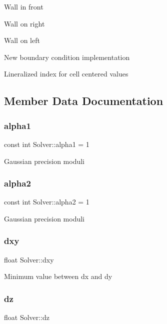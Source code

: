 Wall in front

Wall on right

Wall on left

New boundary condition implementation

Lineralized index for cell centered values 

\subsection{Member Data Documentation}
\mbox{\label{classSolver_a1dba41a0d2c04b18cf121e2730a5d2f0}} 
\subsubsection{\texorpdfstring{alpha1}{alpha1}}
{\footnotesize\ttfamily const int Solver\+::alpha1 = 1\hspace{0.3cm}{\ttfamily [protected]}}

Gaussian precision moduli \mbox{\label{classSolver_ac6cd00ae8ed99b0375a15fd0973d674b}} 
\subsubsection{\texorpdfstring{alpha2}{alpha2}}
{\footnotesize\ttfamily const int Solver\+::alpha2 = 1\hspace{0.3cm}{\ttfamily [protected]}}

Gaussian precision moduli \mbox{\label{classSolver_acca22a72409a3ccff8662d0000358512}} 
\subsubsection{\texorpdfstring{dxy}{dxy}}
{\footnotesize\ttfamily float Solver\+::dxy\hspace{0.3cm}{\ttfamily [protected]}}

Minimum value between dx and dy \mbox{\label{classSolver_aed4366cb221b3429a878cb39a06b0ef4}} 
\subsubsection{\texorpdfstring{dz}{dz}}
{\footnotesize\ttfamily float Solver\+::dz\hspace{0.3cm}{\ttfamily [protected]}}

